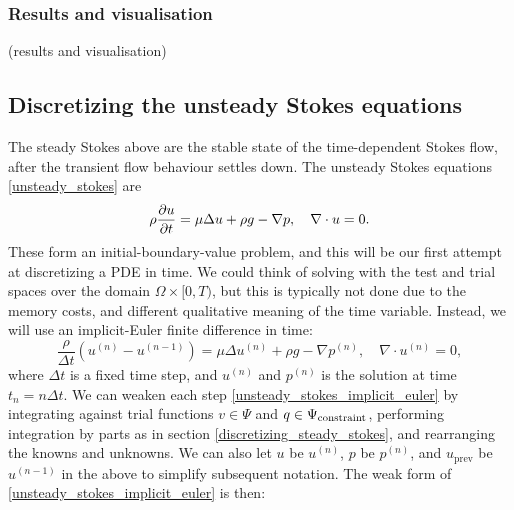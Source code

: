 \subsubsection{Results and visualisation}
\vskip 0.2in
(results and visualisation)
\vskip 0.2in
\subsection{Discretizing the unsteady Stokes equations}\label{discretizing_unsteady_stokes}
\newcommand{\uprev}{{u_{\text{prev}}}}
The steady Stokes above are the stable state of the time-dependent Stokes flow,
after the transient flow behaviour settles down. The unsteady Stokes equations \eqref{unsteady_stokes} are
\begin{equation*}
    \rho\frac{\partial u}{\partial t} = \mu\Delta u + \rho g - \nabla p, \quad \nabla\cdot u = 0.
\end{equation*}
These form an initial-boundary-value problem, and this will be our first attempt at discretizing a PDE in time.
We could think of solving with the test and trial spaces over the domain $\Omega \times [0, T)$, but this is typically not done due to the memory costs,
and different qualitative meaning of the time variable. Instead, we will use an implicit-Euler finite difference in time: 
\begin{equation}\label{unsteady_stokes_implicit_euler}
    \frac{\rho}{\Delta t} \left(u^{(n)} - u^{(n-1)}\right) = \mu\Delta u^{(n)} + \rho g - \nabla p^{(n)}, \quad \nabla\cdot u^{(n)} = 0,
\end{equation}
where $\Delta t$ is a fixed time step, and $u^{(n)}$ and $p^{(n)}$ is the solution at time $t_n = n\Delta t$. We can weaken each step
\eqref{unsteady_stokes_implicit_euler}
by integrating against trial functions $v \in \Psi$ and $q \in {\Psi_{\text{constraint}}}$, performing integration by parts as in section \ref{discretizing_steady_stokes},
and rearranging the knowns and unknowns. We can also let $u$ be $u^{(n)}$, $p$ be $p^{(n)}$, and $\uprev$ be $u^{(n-1)}$ in the above to simplify
subsequent notation. The weak form of \eqref{unsteady_stokes_implicit_euler} is then:
